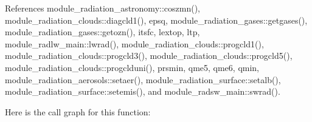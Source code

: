 References module\+\_\+radiation\+\_\+astronomy\+::coszmn(), module\+\_\+radiation\+\_\+clouds\+::diagcld1(), epsq, module\+\_\+radiation\+\_\+gases\+::getgases(), module\+\_\+radiation\+\_\+gases\+::getozn(), itsfc, lextop, ltp, module\+\_\+radlw\+\_\+main\+::lwrad(), module\+\_\+radiation\+\_\+clouds\+::progcld1(), module\+\_\+radiation\+\_\+clouds\+::progcld3(), module\+\_\+radiation\+\_\+clouds\+::progcld5(), module\+\_\+radiation\+\_\+clouds\+::progclduni(), prsmin, qme5, qme6, qmin, module\+\_\+radiation\+\_\+aerosols\+::setaer(), module\+\_\+radiation\+\_\+surface\+::setalb(), module\+\_\+radiation\+\_\+surface\+::setemis(), and module\+\_\+radsw\+\_\+main\+::swrad().

Here is the call graph for this function\+:
